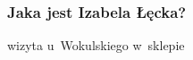 \subsubsection*{Jaka jest Izabela Łęcka?}
\begin{description}
    \item wizyta u~Wokulskiego w~sklepie
\end{description}
